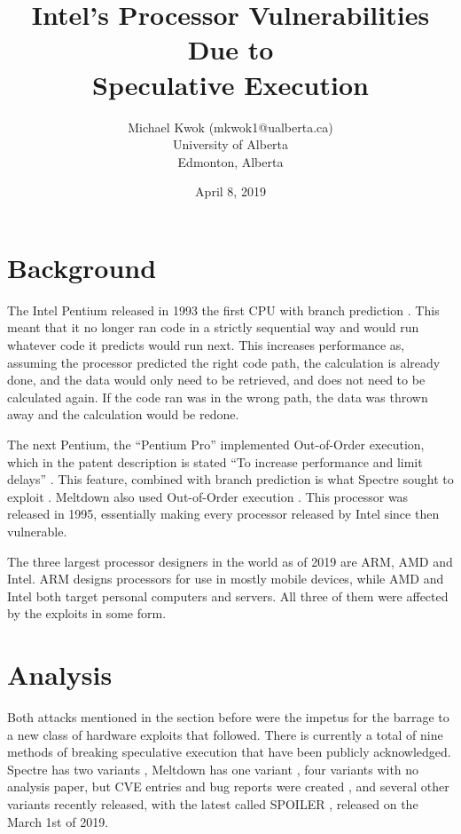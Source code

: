 \documentclass[12pt]{article}
\title{Intel's Processor Vulnerabilities Due to \\ Speculative Execution}
\author{Michael Kwok (mkwok1@ualberta.ca) \\ University of Alberta \\ Edmonton, Alberta}
\date{April 8, 2019}
\begin{document}
\clearpage\maketitle
\thispagestyle{empty}

\pagebreak

\section*{Background}

The Intel Pentium released in 1993 the first CPU with branch prediction \cite{Intel:Pentium}. This meant that it no longer ran code in a strictly sequential way and would run whatever code it predicts would run next. This increases performance as, assuming the processor predicted the right code path, the calculation is already done, and the data would only need to be retrieved, and does not need to be calculated again. If the code ran was in the wrong path, the data was thrown away and the calculation would be redone.

The next Pentium, the ``Pentium Pro'' implemented Out-of-Order execution, which in the patent description is stated ``To increase performance and limit delays'' \cite{Patents:OutOfOrder}. This feature, combined with branch prediction is what Spectre sought to exploit \cite[Sec.~1]{Paper:Spectre}. Meltdown also used Out-of-Order execution \cite{Paper:Meltdown}. This processor was released in 1995, essentially making every processor released by Intel since then vulnerable.

The three largest processor designers in the world as of 2019 are ARM, AMD and Intel. ARM designs processors for use in mostly mobile devices, while AMD and Intel both target personal computers and servers. All three of them were affected by the exploits in some form.

\section*{Analysis}

Both attacks mentioned in the section before were the impetus for the barrage to a new class of hardware exploits that followed. There is currently a total of nine methods of breaking speculative execution that have been publicly acknowledged. Spectre has two variants \cite[Sec.~1.2]{Paper:Spectre}, Meltdown has one variant \cite{Paper:Meltdown}, four variants with no analysis paper, but CVE entries and bug reports were created \cite{Heise:SpectreNG}, and several other variants recently released, with the latest called SPOILER \cite{Paper:SPOILER}, released on the March 1st of 2019.
\end{document}
